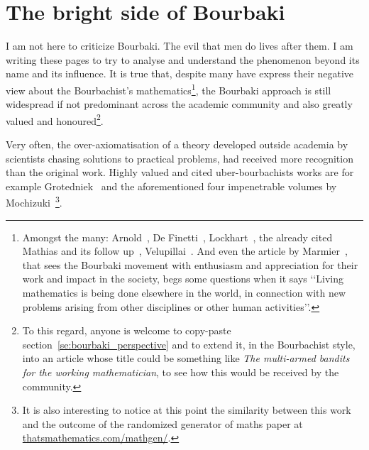 \documentclass[]{scrartcl}
\theoremstyle{definition}
\begin{document}
\section*{The bright side of Bourbaki}




I am not here to criticize Bourbaki. The evil that men do lives after them. I am writing these pages to try to analyse and understand the phenomenon beyond its name and its influence.
It is true that, despite many have express their negative view about the Bourbachist's mathematics\footnote{
    Amongst the many: Arnold~\cite{arnol1998teaching}, De Finetti~\cite{de2008bruno}, Lockhart~\cite{lockhart2009mathematician}, the already cited Mathias and its follow up~\cite{mathias1998further}, Velupillai~\cite{velupillai2012bourbaki}. And even the article by Marmier~\cite{marmier2014idea}, that sees the Bourbaki movement with enthusiasm and appreciation for their work and impact in the society, begs some questions when it says
    \lq\lq Living mathematics is being done elsewhere in the world, in connection with new problems arising from other disciplines or other human activities\rq\rq.
}, the Bourbaki approach is still widespread if not predominant across the academic community and also greatly valued and honoured\footnote{
    To this regard, anyone is welcome to copy-paste section~\ref{se:bourbaki_perspective} and to extend it, in the Bourbachist style, into an article whose title could be something like \emph{The multi-armed bandits for the working mathematician}, to see how this would be received by the community.
}.

Very often, the over-axiomatisation of a theory developed outside academia by scientists chasing solutions to practical problems, had received more recognition than the original work.
Highly valued and cited uber-bourbachists works are for example Grotedniek~\cite{grothendieck2011some} and the aforementioned four impenetrable volumes by Mochizuki~\cite{mochizuki2012inter}\footnote{
    It is also interesting to notice at this point the similarity between this work and the outcome of the randomized generator of maths paper at \href{https://thatsmathematics.com/mathgen/}{thatsmathematics.com/mathgen/}.
}.
\end{document}
